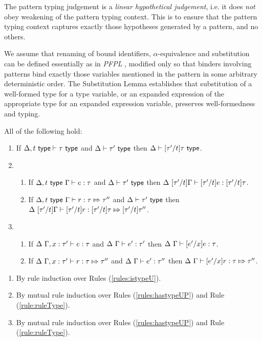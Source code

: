 {{{{The {pattern typing judgement} is a \emph{linear hypothetical judgement}, i.e. it does \emph{not} obey weakening of the pattern typing context. This is to ensure that the pattern typing context captures exactly those hypotheses generated by a pattern, and no others.

We assume that renaming of bound identifiers, $\alpha$-equivalence and substitution can be defined essentially as in \emph{PFPL} \cite{pfpl}, modified only so that binders involving patterns bind exactly those variables mentioned in the pattern in some arbitrary deterministic order. The Substitution Lemma establishes that substitution of a well-formed type for a type variable, or an expanded expression of the appropriate type for an expanded expression variable, preserves well-formedness and typing.
\begin{lemma}[Substitution]\label{lemma:substitution-UP} All of the following hold:
\begin{enumerate}
\item If $\Delta, t~\mathsf{type} \vdash \tau~\mathsf{type}$ and $\Delta \vdash \tau'~\mathsf{type}$ then $\Delta \vdash [\tau'/t]\tau~\mathsf{type}$.
\item \begin{enumerate}
  \item If $\Delta, t~\mathsf{type}~\Gamma \vdash e : \tau$ and $\Delta \vdash \tau'~\mathsf{type}$ then $\Delta~[\tau'/t]\Gamma \vdash [\tau'/t]e : [\tau'/t]\tau$.
  \item If $\Delta, t~\mathsf{type}~\Gamma \vdash r : \tau \Mapsto \tau''$ and $\Delta \vdash \tau'~\mathsf{type}$ then $\Delta~[\tau'/t]\Gamma \vdash [\tau'/t]r : [\tau'/t]\tau \Mapsto [\tau'/t]\tau''$.
  \end{enumerate}
\item \begin{enumerate}
  \item If $\Delta~\Gamma, x : \tau' \vdash e : \tau$ and $\Delta~\Gamma \vdash e' : \tau'$ then $\Delta~\Gamma \vdash [e'/x]e : \tau$.
  \item If $\Delta~\Gamma, x : \tau' \vdash r : \tau \Mapsto \tau''$ and $\Delta~\Gamma \vdash e' : \tau''$ then $\Delta~\Gamma \vdash [e'/x]r : \tau \Mapsto \tau''$.
  \end{enumerate}
\end{enumerate}\end{lemma}
\begin{proof-sketch}
\begin{enumerate}
\item By rule induction over Rules (\ref{rules:istypeU}).
\item By mutual rule induction over Rules (\ref{rules:hastypeUP}) and Rule (\ref{rule:ruleType}).
\item By mutual rule induction over Rules (\ref{rules:hastypeUP}) and Rule (\ref{rule:ruleType}).
\end{enumerate}
\end{proof-sketch}

}}}}
